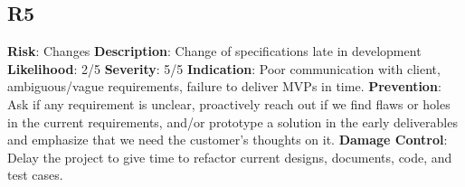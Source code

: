 \documentclass{article}
\begin{document}
\subsection{R5}
\textbf{Risk}: Changes \newline
\textbf{Description}: Change of specifications late in development  \newline
\textbf{Likelihood}: 2/5\newline
\textbf{Severity}: 5/5 \newline
\textbf{Indication}: Poor communication with client, ambiguous/vague requirements, failure to deliver MVPs in time.\newline
\textbf{Prevention}: Ask if any requirement is unclear, proactively reach out if we find flaws or holes in the current requirements, and/or prototype a solution in the early deliverables and emphasize that we need the customer's thoughts on it.\newline
\textbf{Damage Control}: Delay the project to give time to refactor current designs, documents, code, and test cases. \newline
\end{document}
